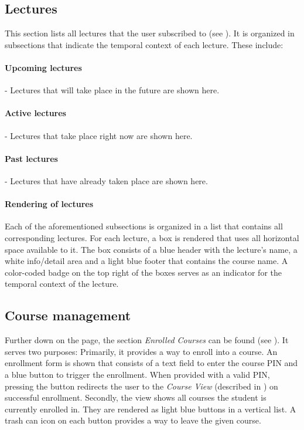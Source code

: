 \subsection{Lectures}
\label{section:soa:mainview:lectures}
This section lists all lectures that the user subscribed to (see ). It is organized in subsections that indicate the temporal context of each lecture. These include:

\paragraph{Upcoming lectures} - Lectures that will take place in the future are shown here.
\paragraph{Active lectures} - Lectures that take place right now are shown here.
\paragraph{Past lectures} - Lectures that have already taken place are shown here.

\paragraph{Rendering of lectures}

Each of the aforementioned subsections is organized in a list that contains all corresponding lectures. For each lecture, a box is rendered that uses all horizontal space available to it. The box consists of a blue header with the lecture's name, a white info/detail area and a light blue footer that contains the course name.
A color-coded badge on the top right of the boxes serves as an indicator for the temporal context of the lecture.



\subsection{Course management}

Further down on the page, the section \emph{Enrolled Courses} can be found (see ). It serves two purposes: Primarily, it provides a way to enroll into a course. An enrollment form is shown that consists of a text field to enter the course PIN and a blue button to trigger the enrollment. When provided with a valid PIN, pressing the button redirects the user to the \emph{Course View} (described in ) on successful enrollment.
Secondly, the view shows all courses the student is currently enrolled in. They are rendered as light blue buttons in a vertical list. A trash can icon on each button provides a way to leave the given course.

